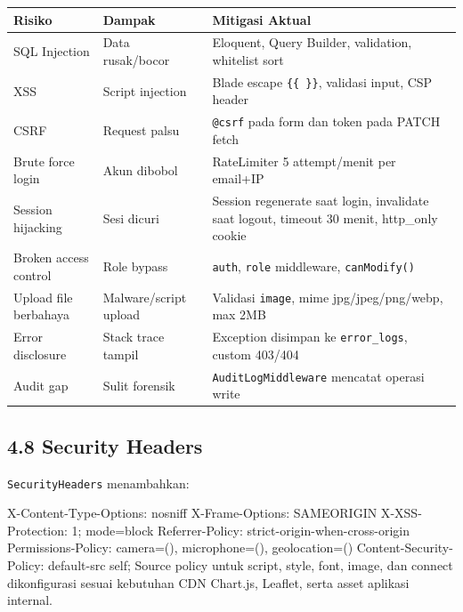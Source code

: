 \documentclass[
]{article}
\newenvironment{Shaded}{}{}
\newcommand{\NormalTok}[1]{#1}
\begin{document}
\begin{longtable}[]{@{}P{0.20\textwidth}P{0.26\textwidth}P{0.50\textwidth}@{}}
\toprule\noalign{}
Risiko & Dampak & Mitigasi Aktual \\
\midrule\noalign{}
\endhead
\bottomrule\noalign{}
\endlastfoot
SQL Injection & Data rusak/bocor & Eloquent, Query Builder, validation,
whitelist sort \\
XSS & Script injection & Blade escape \texttt{\{\{\ \}\}}, validasi
input, CSP header \\
CSRF & Request palsu & \texttt{@csrf} pada form dan token pada PATCH
fetch \\
Brute force login & Akun dibobol & RateLimiter 5 attempt/menit per
email+IP \\
Session hijacking & Sesi dicuri & Session regenerate saat login,
invalidate saat logout, timeout 30 menit, http\_only cookie \\
Broken access control & Role bypass & \texttt{auth}, \texttt{role}
middleware, \texttt{canModify()} \\
Upload file berbahaya & Malware/script upload & Validasi \texttt{image},
mime jpg/jpeg/png/webp, max 2MB \\
Error disclosure & Stack trace tampil & Exception disimpan ke
\texttt{error\_logs}, custom 403/404 \\
Audit gap & Sulit forensik & \texttt{AuditLogMiddleware} mencatat
operasi write \\
\end{longtable}

\subsection{4.8 Security Headers}\label{48-security-headers}

\texttt{SecurityHeaders} menambahkan:

\begin{Shaded}
\begin{Highlighting}[]
\NormalTok{X{-}Content{-}Type{-}Options: nosniff}
\NormalTok{X{-}Frame{-}Options: SAMEORIGIN}
\NormalTok{X{-}XSS{-}Protection: 1; mode=block}
\NormalTok{Referrer{-}Policy: strict{-}origin{-}when{-}cross{-}origin}
\NormalTok{Permissions{-}Policy: camera=(), microphone=(), geolocation=()}
\NormalTok{Content{-}Security{-}Policy: default{-}src \textquotesingle{}self\textquotesingle{};}
\NormalTok{Source policy untuk script, style, font, image, dan connect}
\NormalTok{dikonfigurasi sesuai kebutuhan CDN Chart.js, Leaflet,}
\NormalTok{serta asset aplikasi internal.}
\end{Highlighting}
\end{Shaded}
\end{document}
